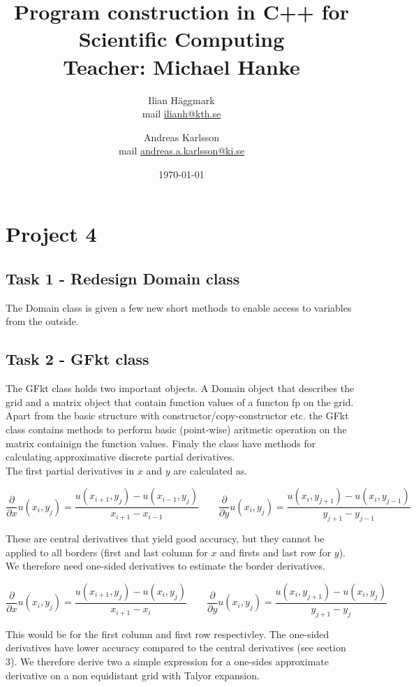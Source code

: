 \documentclass[paper=a4, fontsize=12pt]{article} %
\title{Program construction in C++ for Scientific Computing \\ Teacher: Michael Hanke}
\author{Ilian H{\"a}ggmark \\ mail \href{mailto:ilianh@kth.se}{ilianh@kth.se}
  \and Andreas Karlsson \\ mail \href{mailto:andreas.a.karlsson@ki.se}{andreas.a.karlsson@ki.se} }
\date{\normalsize\today} %
\begin{document}
\maketitle %

\section*{Project 4}
\subsection*{Task 1 - Redesign Domain class}

The Domain class is given a few new short methods to enable access to variables from the outside.\\


\subsection*{Task 2 - GFkt class}

The GFkt class holds two important objects. A Domain object that describes the grid and a matrix object that contain function values of a functon fp on the grid. Apart from the basic structure with constructor/copy-constructor etc. the GFkt class contains methods to perform basic (point-wise) aritmetic operation on the matrix containign the function values. Finaly the class have methods for calculating approximative discrete partial derivatives. \\

The first partial derivatives in $x$ and $y$ are calculated as.

$$ \frac{\partial}{\partial x} u(x_i,y_j)  = \frac{u(x_{i+1},y_j)-u(x_{i-1},y_j)}{x_{i+1} - x_{i-1}} \qquad  \frac{\partial}{\partial y} u(x_i,y_j)  = \frac{u(x_{i},y_{j+1})-u(x_{i},y_{j-1})}{y_{j+1} - y_{j-1}}$$ 

These are central derivatives that yield good accuracy, but they cannot be applied to all borders (first and last column for $x$ and firsts and last row for $y$). We therefore need one-sided derivatives to estimate the border derivatives.

$$ \frac{\partial}{\partial x} u(x_i,y_j)  = \frac{u(x_{i+1},y_j)-u(x_{i},y_j)}{x_{i+1} - x_{i}} \qquad  \frac{\partial}{\partial y} u(x_i,y_j)  = \frac{u(x_{i},y_{j+1})-u(x_{i},y_{j})}{y_{j+1} - y_{j}}$$

This would be for the first column and first row respectivley. The one-sided derivatives have lower accuracy compared to the central derivatives (see section 3). We therefore derive two a simple expression for a one-sides approximate derivative on a non equidistant grid with Talyor expansion. 
\end{document}
